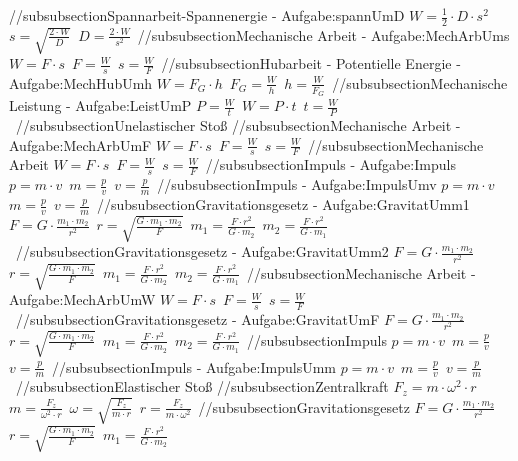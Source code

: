 //subsubsection{Spannarbeit-Spannenergie - Aufgabe:spannUmD} 
$ W =\frac{1}{2}\cdot D\cdot s^{2} $\ 
$ s = \sqrt{\frac{2\cdot W}{ D}} $\ 
$ D =\frac{2\cdot W}{s^{2} } $\ 
//subsubsection{Mechanische Arbeit - Aufgabe:MechArbUms} 
$ W = F\cdot s $\ 
$ F = \frac{W}{s} $\ 
$ s = \frac{W}{F} $\ 
//subsubsection{Hubarbeit - Potentielle Energie - Aufgabe:MechHubUmh} 
$ W = F_{G} \cdot h $\ 
$ F_{G}  = \frac{W}{h} $\ 
$ h = \frac{W}{F_{G} } $\ 
//subsubsection{Mechanische Leistung - Aufgabe:LeistUmP} 
$ P = \frac{W}{t} $\ 
$ W = P\cdot t $\ 
$ t = \frac{W}{P} $\ 
//subsubsection{Unelastischer Stoß} 
//subsubsection{Mechanische Arbeit - Aufgabe:MechArbUmF} 
$ W = F\cdot s $\ 
$ F = \frac{W}{s} $\ 
$ s = \frac{W}{F} $\ 
//subsubsection{Mechanische Arbeit} 
$ W = F\cdot s $\ 
$ F = \frac{W}{s} $\ 
$ s = \frac{W}{F} $\ 
//subsubsection{Impuls - Aufgabe:Impuls} 
$ p = m\cdot v $\ 
$ m = \frac{p}{v} $\ 
$ v = \frac{p}{m} $\ 
//subsubsection{Impuls - Aufgabe:ImpulsUmv} 
$ p = m\cdot v $\ 
$ m = \frac{p}{v} $\ 
$ v = \frac{p}{m} $\ 
//subsubsection{Gravitationsgesetz - Aufgabe:GravitatUmm1} 
$ F = G \cdot  \frac{m_{1} \cdot m_{2} }{  r^{2} } $\ 
$ r = \sqrt{\frac{G\cdot m_{1} \cdot m_{2} }{   F}} $\ 
$ m_{1}  =  \frac{F\cdot r^{2} }{G\cdot m_{2} } $\ 
$ m_{2}  =  \frac{F\cdot r^{2} }{G\cdot m_{1} } $\ 
//subsubsection{Gravitationsgesetz - Aufgabe:GravitatUmm2} 
$ F = G \cdot  \frac{m_{1} \cdot m_{2} }{  r^{2} } $\ 
$ r = \sqrt{\frac{G\cdot m_{1} \cdot m_{2} }{   F}} $\ 
$ m_{1}  =  \frac{F\cdot r^{2} }{G\cdot m_{2} } $\ 
$ m_{2}  =  \frac{F\cdot r^{2} }{G\cdot m_{1} } $\ 
//subsubsection{Mechanische Arbeit - Aufgabe:MechArbUmW} 
$ W = F\cdot s $\ 
$ F = \frac{W}{s} $\ 
$ s = \frac{W}{F} $\ 
//subsubsection{Gravitationsgesetz - Aufgabe:GravitatUmF} 
$ F = G \cdot  \frac{m_{1} \cdot m_{2} }{  r^{2} } $\ 
$ r = \sqrt{\frac{G\cdot m_{1} \cdot m_{2} }{   F}} $\ 
$ m_{1}  =  \frac{F\cdot r^{2} }{G\cdot m_{2} } $\ 
$ m_{2}  =  \frac{F\cdot r^{2} }{G\cdot m_{1} } $\ 
//subsubsection{Impuls} 
$ p = m\cdot v $\ 
$ m = \frac{p}{v} $\ 
$ v = \frac{p}{m} $\ 
//subsubsection{Impuls - Aufgabe:ImpulsUmm} 
$ p = m\cdot v $\ 
$ m = \frac{p}{v} $\ 
$ v = \frac{p}{m} $\ 
//subsubsection{Elastischer Stoß} 
//subsubsection{Zentralkraft} 
$ F_{z}  = m\cdot \omega ^{2} \cdot r $\ 
$ m = \frac{ F_{z} }{\omega ^{2} \cdot r} $\ 
$ \omega  = \sqrt{\frac{ F_{z} }{m\cdot r}} $\ 
$ r = \frac{ F_{z} }{m\cdot \omega ^{2} } $\ 
//subsubsection{Gravitationsgesetz} 
$ F = G \cdot  \frac{m_{1} \cdot m_{2} }{  r^{2} } $\ 
$ r = \sqrt{\frac{G\cdot m_{1} \cdot m_{2} }{   F}} $\ 
$ m_{1}  =  \frac{F\cdot r^{2} }{G\cdot m_{2} } $\ 
